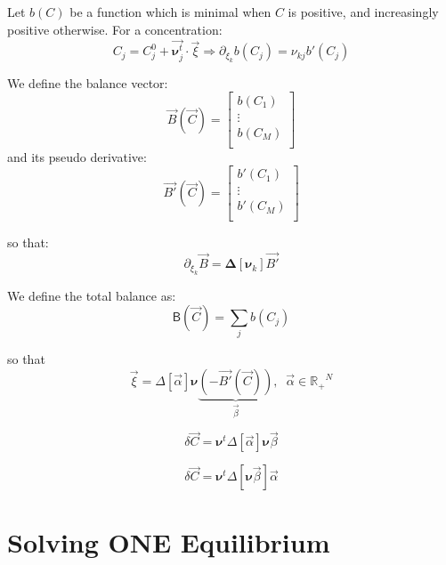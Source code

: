 \documentclass[aps,12pt]{revtex4}
\begin{document}
Let $b(C)$ be a function which is minimal when $C$ is positive, and increasingly positive otherwise.
For a concentration:
\begin{equation}
C_j = C_j^0 + \vec{\bm{\nu}^t_j} \cdot \vec{\xi} \Rightarrow \partial_{\xi_k} b(C_j) = \nu_{kj} b'(C_j)
\end{equation}

We define the balance vector:
\begin{equation}
\vec{B}(\vec{C}) = 
\begin{bmatrix}
	b(C_1) \\
	\vdots\\
	b(C_M)\\
\end{bmatrix}
\end{equation}
and its pseudo derivative:
\begin{equation}
\vec{B'}(\vec{C}) = 
\begin{bmatrix}
	b'(C_1) \\
	\vdots\\
	b'(C_M)\\
\end{bmatrix}
\end{equation} 

so that:
\begin{equation}
	\partial_{\xi_k} \vec{B} = \bm{\Delta}[\bm{\nu}_k] \vec{B'}
\end{equation}

We define the total balance as:
\begin{equation}
	\mathsf{B}(\vec{C}) = \sum_j b(C_j)
\end{equation}

so that
\begin{equation}
	\vec{\xi} = \Delta[\vec{\alpha}] \bm{\nu} \underbrace{\left( -\vec{B' }(\vec{C}) \right)}_{\vec{\beta}}, \;\;\vec{\alpha} \in {\mathbb{R}_+}^N
\end{equation}

\begin{equation}
	\delta\vec{C} = \bm{\nu}^t \Delta[\vec{\alpha}] \bm{\nu} \vec{\beta}
\end{equation}

\begin{equation}
	\delta\vec{C} = \bm{\nu}^t \Delta[\bm{\nu} \vec{\beta}] \vec{\alpha}
\end{equation}


\section{Solving ONE Equilibrium}
\end{document}
